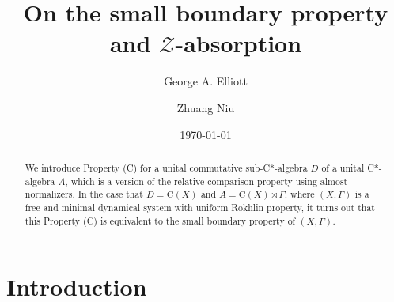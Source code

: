 \documentclass[12pt, oneside, psamsfonts]{amsart}
\theoremstyle{definition}
\theoremstyle{remark}
\numberwithin{equation}{section}
\newcommand{\Int}{\mathbb Z}
\begin{document}


\title{On the small boundary property and $\mathcal Z$-absorption}

\author{George A. Elliott}
\address{Department of Mathematics, University of Toronto, Toronto, Ontario, Canada~\ M5S 2E4}


\author{Zhuang Niu}
\address{Department of Mathematics and Statistics, University of Wyoming, Laramie, Wyoming 82071, USA}


\date{\today}


\begin{abstract}
We introduce Property (C) for a unital commutative sub-C*-algebra $D$ of a unital C*-algebra $A$, which is a version of the relative comparison property using almost normalizers. In the case that $D = \mathrm{C}(X)$ and $A = \mathrm{C}(X) \rtimes\Gamma$, where $(X, \Gamma)$ is a free and minimal dynamical system with uniform Rokhlin property, it turns out that this Property (C) is equivalent to the small boundary property of $(X, \Gamma)$.



\end{abstract}

\maketitle

\setcounter{tocdepth}{1}


\section{Introduction}
\end{document}
